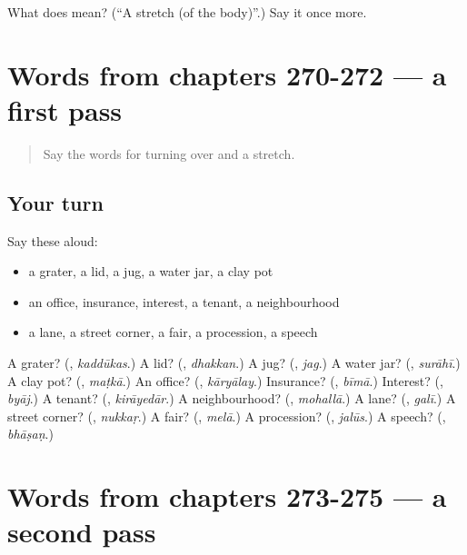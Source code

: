 \begin{tcolorbox}[breakable,colback=teal!4,colframe=teal!35!black,title={Before you move on}]
What does  mean? (\textquotedblleft{}A stretch (of the body)\textquotedblright{}.) Say it once more.
\end{tcolorbox}
\section[(dialogue)]{Words from chapters 270-272 — a first pass}

\label{lesson:HI-R275-first-pass-words-from-chapters-270-272}



\begin{quote}
Say the words for turning over and a stretch.
\end{quote}

\subsection*{Your turn}
Say these aloud:

\begin{itemize}
\raggedright
  \item a grater, a lid, a jug, a water jar, a clay pot
  \item an office, insurance, interest, a tenant, a neighbourhood
  \item a lane, a street corner, a fair, a procession, a speech
\end{itemize}

\begin{tcolorbox}[breakable,colback=teal!4,colframe=teal!35!black,title={Before you move on}]
A grater? (\textbf{}, \emph{kaddūkas}.) A lid? (\textbf{}, \emph{dhakkan}.) A jug? (\textbf{}, \emph{jag}.) A water jar? (\textbf{}, \emph{surāhī}.) A clay pot? (\textbf{}, \emph{maṭkā}.) An office? (\textbf{}, \emph{kāryālay}.) Insurance? (\textbf{}, \emph{bīmā}.) Interest? (\textbf{}, \emph{byāj}.) A tenant? (\textbf{}, \emph{kirāyedār}.) A neighbourhood? (\textbf{}, \emph{mohallā}.) A lane? (\textbf{}, \emph{galī}.) A street corner? (\textbf{}, \emph{nukkaṛ}.) A fair? (\textbf{}, \emph{melā}.) A procession? (\textbf{}, \emph{jalūs}.) A speech? (\textbf{}, \emph{bhāṣaṇ}.)
\end{tcolorbox}
\section[(dialogue)]{Words from chapters 273-275 — a second pass}

